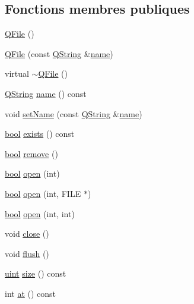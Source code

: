 \subsection*{Fonctions membres publiques}
\begin{DoxyCompactItemize}
\item 
\hyperlink{class_q_file_a4594575fa1a7d3ff40250fb52362cdf9}{Q\+File} ()
\item 
\hyperlink{class_q_file_a2f6f03b893a6accdf03672698154c0ac}{Q\+File} (const \hyperlink{class_q_string}{Q\+String} \&\hyperlink{class_q_file_a11386f4dcc83a4688c829bba80a1dcab}{name})
\item 
virtual \hyperlink{class_q_file_acc10a60e8d9d8b873a43ab9be0b5c137}{$\sim$\+Q\+File} ()
\item 
\hyperlink{class_q_string}{Q\+String} \hyperlink{class_q_file_a11386f4dcc83a4688c829bba80a1dcab}{name} () const 
\item 
void \hyperlink{class_q_file_aedc2f51f8c46021cfb4ae82bae0e3b2d}{set\+Name} (const \hyperlink{class_q_string}{Q\+String} \&\hyperlink{class_q_file_a11386f4dcc83a4688c829bba80a1dcab}{name})
\item 
\hyperlink{qglobal_8h_a1062901a7428fdd9c7f180f5e01ea056}{bool} \hyperlink{class_q_file_a92e45baef18c7ed566cfe51837e8c7ae}{exists} () const 
\item 
\hyperlink{qglobal_8h_a1062901a7428fdd9c7f180f5e01ea056}{bool} \hyperlink{class_q_file_a57d95ea99c22b455ef0fa232299eba11}{remove} ()
\item 
\hyperlink{qglobal_8h_a1062901a7428fdd9c7f180f5e01ea056}{bool} \hyperlink{class_q_file_af10aeafc303904f98b74be9752d2aa43}{open} (int)
\item 
\hyperlink{qglobal_8h_a1062901a7428fdd9c7f180f5e01ea056}{bool} \hyperlink{class_q_file_af97fe0dd1ca0aa8b0a0c72b726a32860}{open} (int, F\+I\+L\+E $\ast$)
\item 
\hyperlink{qglobal_8h_a1062901a7428fdd9c7f180f5e01ea056}{bool} \hyperlink{class_q_file_ac09fbb92aa5fe9e11c6d282e12a72ae5}{open} (int, int)
\item 
void \hyperlink{class_q_file_ac0d8375a5ea7d4503545d7c68dcf58e1}{close} ()
\item 
void \hyperlink{class_q_file_a6d450a55bc3a8145fd33a7ee08051830}{flush} ()
\item 
\hyperlink{qglobal_8h_a4d3943ddea65db7163a58e6c7e8df95a}{uint} \hyperlink{class_q_file_af95320aee4ba0fc3c8702293bca112da}{size} () const 
\item 
int \hyperlink{class_q_file_a8cbf8e411026fa37903b1ab8e023c59c}{at} () const 

\end{DoxyCompactItemize}
